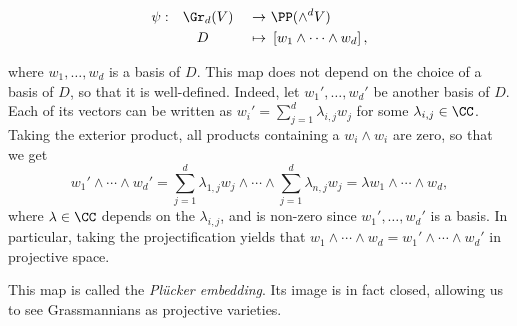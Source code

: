\begin{alignat*}{4}
    \psi: \quad &\Gr_d(V) &\ \to\ &\PP(\wedge^d V)\\
           & \quad D &\ \mapsto\ &\left[w_1 \wedge \cdots \wedge w_d \right],
\end{alignat*}

where $w_1, \ldots, w_d$ is a basis of $D$. This map does not depend on the choice of a basis of $D$, so that it is well-defined. Indeed, let $w_1' , \ldots, w_d'$ be another basis of $D$. Each of its vectors can be written as $w_i' = \sum_{j = 1}^d \lambda_{i,j} w_j$ for some $\lambda_{i,j} \in \CC$. Taking the exterior product, all products containing a $w_i \wedge w_i$ are zero, so that we get
\[ w_1' \wedge \cdots \wedge w_d' = \sum_{j = 1}^d \lambda_{1,j} w_j \wedge \cdots \wedge \sum_{j = 1}^d \lambda_{n,j} w_j = \lambda w_1 \wedge \cdots \wedge w_d, \]
where $\lambda \in \CC$ depends on the $\lambda_{i,j}$, and is non-zero since $w_1', \ldots, w_d'$ is a basis. In particular, taking the projectification yields that $w_1 \wedge \cdots \wedge w_d = w_1' \wedge \cdots \wedge w_d'$ in projective space.

This map is called the  \emph{Plücker embedding}. Its image is in fact closed, allowing us to see Grassmannians as projective varieties.

